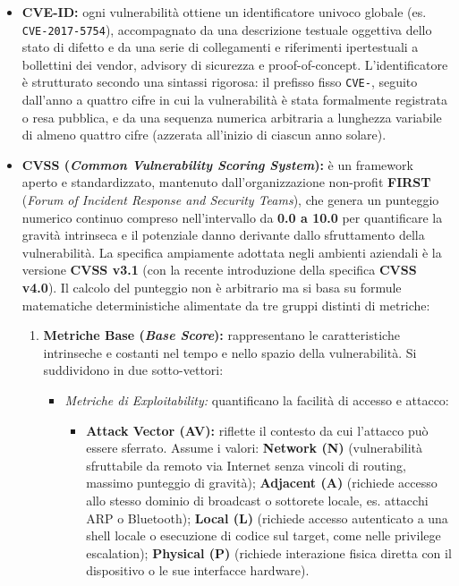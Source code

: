 \documentclass[../../main.tex]{subfiles}
\begin{document}
\begin{itemize}
    \item \textbf{CVE-ID:} ogni vulnerabilità ottiene un identificatore univoco globale (es. \texttt{CVE-2017-5754}), accompagnato da una descrizione testuale oggettiva dello stato di difetto e da una serie di collegamenti e riferimenti ipertestuali a bollettini dei vendor, advisory di sicurezza e proof-of-concept. L'identificatore è strutturato secondo una sintassi rigorosa: il prefisso fisso \texttt{CVE-}, seguito dall'anno a quattro cifre in cui la vulnerabilità è stata formalmente registrata o resa pubblica, e da una sequenza numerica arbitraria a lunghezza variabile di almeno quattro cifre (azzerata all'inizio di ciascun anno solare).
    
    \item \textbf{CVSS (\textit{Common Vulnerability Scoring System}):} è un framework aperto e standardizzato, mantenuto dall'organizzazione non-profit \textbf{FIRST} (\textit{Forum of Incident Response and Security Teams}), che genera un punteggio numerico continuo compreso nell'intervallo da \textbf{0.0 a 10.0} per quantificare la gravità intrinseca e il potenziale danno derivante dallo sfruttamento della vulnerabilità. La specifica ampiamente adottata negli ambienti aziendali è la versione \textbf{CVSS v3.1} (con la recente introduzione della specifica \textbf{CVSS v4.0}). Il calcolo del punteggio non è arbitrario ma si basa su formule matematiche deterministiche alimentate da tre gruppi distinti di metriche:
    \begin{enumerate}
        \item \textbf{Metriche Base (\textit{Base Score}):} rappresentano le caratteristiche intrinseche e costanti nel tempo e nello spazio della vulnerabilità. Si suddividono in due sotto-vettori:
        \begin{itemize}
            \item \textit{Metriche di Exploitability:} quantificano la facilità di accesso e attacco:
            \begin{itemize}
                \item \textbf{Attack Vector (AV):} riflette il contesto da cui l'attacco può essere sferrato. Assume i valori: \textbf{Network (N)} (vulnerabilità sfruttabile da remoto via Internet senza vincoli di routing, massimo punteggio di gravità); \textbf{Adjacent (A)} (richiede accesso allo stesso dominio di broadcast o sottorete locale, es. attacchi ARP o Bluetooth); \textbf{Local (L)} (richiede accesso autenticato a una shell locale o esecuzione di codice sul target, come nelle privilege escalation); \textbf{Physical (P)} (richiede interazione fisica diretta con il dispositivo o le sue interfacce hardware).

\end{itemize}
\end{itemize}
\end{enumerate}
\end{itemize}
\end{document}
